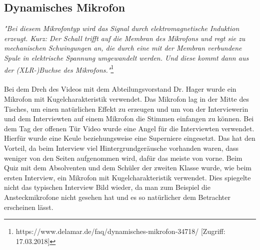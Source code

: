 \subsection{Dynamisches Mikrofon}
\textit{"Bei diesem Mikrofontyp wird das Signal durch elektromagnetische Induktion erzeugt. Kurz: Der Schall trifft auf die Membran des Mikrofons und regt sie zu mechanischen Schwingungen an, die durch eine mit der Membran verbundene Spule in elektrische Spannung umgewandelt werden. Und diese kommt dann aus der (XLR-)Buchse des Mikrofons."}\footnote{\label{}https://www.delamar.de/faq/dynamisches-mikrofon-34718/ [Zugriff: 17.03.2018]} \\ \\
Bei dem Dreh des Videos mit dem Abteilungsvorstand Dr. Hager wurde ein Mikrofon mit Kugelcharakteristik verwendet. Das Mikrofon lag in der Mitte des Tisches, um einen natürlichen Effekt zu erzeugen und um von der Interviewerin und dem Interviewten auf einem Mikrofon die Stimmen einfangen zu können.
Bei dem Tag der offenen Tür Video wurde eine Angel für die Interviewten verwendet. Hierfür wurde eine Keule beziehungsweise eine Superniere eingesetzt. Das hat den Vorteil, da beim Interview viel Hintergrundgeräusche vorhanden waren, dass weniger von den Seiten aufgenommen wird, dafür das meiste von vorne.
Beim Quiz mit dem Absolventen und dem Schüler der zweiten Klasse wurde, wie beim ersten Interview, ein Mikrofon mit Kugelcharakteristik verwendet. Dies spiegelte nicht das typischen Interview Bild wieder, da man zum Beispiel die Ansteckmikrofone nicht gesehen hat und es so natürlicher dem Betrachter erscheinen lässt.
